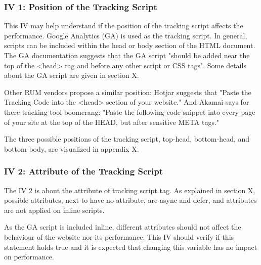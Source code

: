 \subsubsection{IV 1: Position of the Tracking Script}


This IV may help understand if the position of the tracking script affects the performance.
Google Analytics (GA) is used as the tracking script.
In general, scripts can be included within the head or body section of the HTML document. %
The GA documentation suggests that the GA script "should be added near the top of the <head> tag and before any other script or CSS tags".
Some details about the GA script are given in section X.


Other RUM vendors propose a similar position:
Hotjar suggests that "Paste the Tracking Code into the <head> section of your website."
And Akamai says for there tracking tool boomerang:
"Paste the following code snippet into every page of your site at the top of the HEAD, but after sensitive META tags."

The three possible positions of the tracking script, top-head, bottom-head, and bottom-body, are visualized in appendix X.






\subsubsection{IV 2: Attribute of the Tracking Script}

The IV 2 is about the attribute of tracking script tag.
As explained in section X, possible attributes, next to have no attribute, are async and defer, and attributes are not applied on inline scripts.

As the GA script is included inline, different attributes should not affect the behaviour of the website nor its performance.
This IV should verify if this statement holds true and it is expected that changing this variable has no impact on performance.

